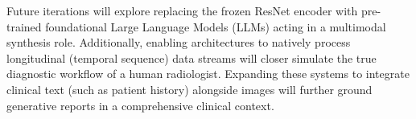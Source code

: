\documentclass[10pt,a4paper,twocolumn]{article}
\begin{document}
Future iterations will explore replacing the frozen ResNet encoder with pre-trained foundational Large Language Models (LLMs) acting in a multimodal synthesis role. Additionally, enabling architectures to natively process longitudinal (temporal sequence) data streams will closer simulate the true diagnostic workflow of a human radiologist. Expanding these systems to integrate clinical text (such as patient history) alongside images will further ground generative reports in a comprehensive clinical context.



\end{document}
